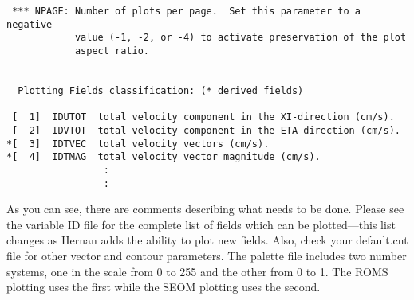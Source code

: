 \begin{verbatim}
 *** NPAGE: Number of plots per page.  Set this parameter to a negative
            value (-1, -2, or -4) to activate preservation of the plot
            aspect ratio.


  Plotting Fields classification: (* derived fields)

 [  1]  IDUTOT  total velocity component in the XI-direction (cm/s).
 [  2]  IDVTOT  total velocity component in the ETA-direction (cm/s).
*[  3]  IDTVEC  total velocity vectors (cm/s).
*[  4]  IDTMAG  total velocity vector magnitude (cm/s).
                 :
                 :
\end{verbatim}
As you can see, there are comments describing what needs to be
done.  Please see the variable ID file for the complete list of fields
which can be plotted---this list changes as Hernan adds the ability to
plot new fields. Also, check your default.cnt file for other vector and
contour parameters. The palette file includes two number systems, one
in the scale from 0 to 255 and the other from 0 to 1.
The ROMS plotting uses the first while the SEOM plotting uses the
second.
